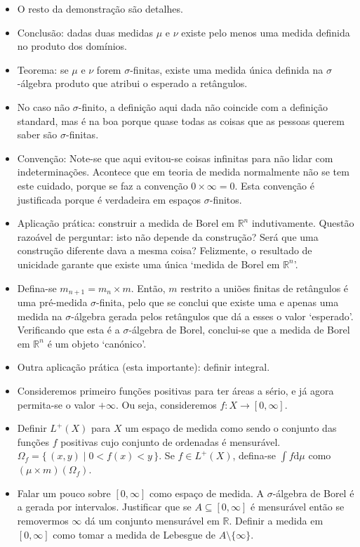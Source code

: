 \documentclass{article}
\newcommand{\R}{\mathbb{R}}
\newcommand{\dd}{\mathrm{d}}
\begin{document}
\begin{itemize}
\item O resto da demonstração são detalhes.
\item Conclusão: dadas duas medidas $\mu$ e $\nu$ existe pelo menos uma medida definida no produto dos domínios.
\item Teorema: se $\mu$ e $\nu$ forem $\sigma$-finitas, existe uma medida única definida na $\sigma$-álgebra produto que atribui o esperado a retângulos.
\item No caso não $\sigma$-finito, a definição aqui dada não coincide com a definição standard, mas é na boa porque quase todas as coisas que as pessoas querem saber são $\sigma$-finitas.
\item Convenção: Note-se que aqui evitou-se coisas infinitas para não lidar com indeterminações. Acontece que em teoria de medida normalmente não se tem este cuidado, porque se faz a convenção $0 \times \infty = 0$. Esta convenção é justificada porque é verdadeira em espaços $\sigma$-finitos.
\item Aplicação prática: construir a medida de Borel em $\R^n$ indutivamente. Questão razoável de perguntar: isto não depende da construção? Será que uma construção diferente dava a mesma coisa? Felizmente, o resultado de unicidade garante que existe uma única `medida de Borel em $\R^n$'.
\item Defina-se $m_{n+1} = m_n \times m$. Então, $m$ restrito a uniões finitas de retângulos é uma pré-medida $\sigma$-finita, pelo que se conclui que existe uma e apenas uma medida na $\sigma$-álgebra gerada pelos retângulos que dá a esses o valor `esperado'. Verificando que esta é a $\sigma$-álgebra de Borel, conclui-se que a medida de Borel em $\R^n$ é um objeto `canónico'.
\item Outra aplicação prática (esta importante): definir integral.
\item Consideremos primeiro funções positivas para ter áreas a sério, e já agora permita-se o valor $+\infty$. Ou seja, consideremos $f : X \to [0,\infty]$.
\item Definir $L^+(X)$ para $X$ um espaço de medida como sendo o conjunto das funções $f$ positivas cujo conjunto de ordenadas é mensurável. $\Omega_f = \{\,(x,y) \mid 0 < f(x) < y\,\}$. Se $f \in L^+(X)$, defina-se $\int f \dd \mu$ como $(\mu \times m)(\Omega_f)$.
\item Falar um pouco sobre $[0,\infty]$ como espaço de medida. A $\sigma$-álgebra de Borel é a gerada por intervalos. Justificar que se $A \subseteq [0,\infty]$ é mensurável então se removermos $\infty$ dá um conjunto mensurável em $\R$. Definir a medida em $[0,\infty]$ como tomar a medida de Lebesgue de $A \setminus \{\infty\}$.

\end{itemize}
\end{document}

